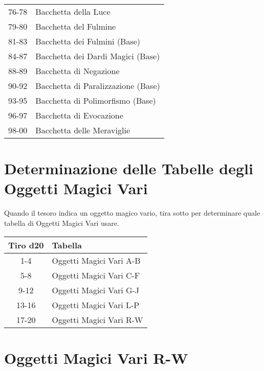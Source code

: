 \documentclass{article}
\begin{document}
\begin{multicols}{2}
\begin{tabular}{|c|l|}
76-78 & Bacchetta della Luce \\
79-80 & Bacchetta del Fulmine \\
81-83 & Bacchetta dei Fulmini (Base) \\
84-87 & Bacchetta dei Dardi Magici (Base) \\
88-89 & Bacchetta di Negazione \\
90-92 & Bacchetta di Paralizzazione (Base) \\
93-95 & Bacchetta di Polimorfismo (Base) \\
96-97 & Bacchetta di Evocazione \\
98-00 & Bacchetta delle Meraviglie \\
\hline

\end{tabular}

\section{Determinazione delle Tabelle degli Oggetti Magici Vari}

Quando il tesoro indica un oggetto magico vario, tira sotto per determinare quale tabella di Oggetti Magici Vari usare.

\begin{table}[h]
\centering
\begin{tabular}{|c|l|}
\hline
\textbf{Tiro d20} & \textbf{Tabella} \\
\hline
1-4 & Oggetti Magici Vari A-B \\
5-8 & Oggetti Magici Vari C-F \\
9-12 & Oggetti Magici Vari G-J \\
13-16 & Oggetti Magici Vari L-P \\
17-20 & Oggetti Magici Vari R-W \\
\hline
\end{tabular}

\end{table}


\section{Oggetti Magici Vari R-W}


\end{multicols}
\end{document}
